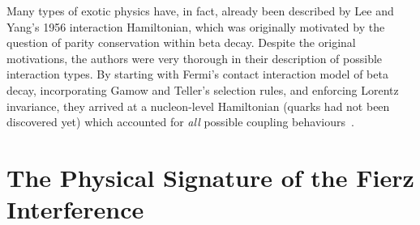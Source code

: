 Many types of exotic physics have, in fact, already been described by Lee and Yang's 1956 interaction Hamiltonian, which was originally motivated by the question of parity conservation within beta decay\cite{LeeYang}.  Despite the original motivations, the authors were very thorough in their description of possible interaction types.  By starting with Fermi's contact interaction model of beta decay, incorporating Gamow and Teller's selection rules, and enforcing Lorentz invariance, they arrived at a nucleon-level Hamiltonian (quarks had not been discovered yet) which accounted for \emph{all} possible coupling behaviours~\cite{GamowTeller}. 





\section{The Physical Signature of the Fierz Interference}
